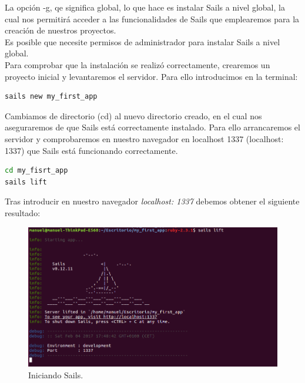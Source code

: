 \begin{appendices}
La opción -g, qe significa global, lo que hace es instalar Sails a nivel global, la cual nos permitirá acceder a las funcionalidades de Sails que emplearemos para la creación de nuestros proyectos.\\

Es posible que necesite permisos de administrador para instalar Sails a nivel global.\\

Para comprobar que la instalación se realizó correctamente, crearemos un proyecto inicial y levantaremos el servidor. Para ello introducimos en la terminal:\\

\begin{lstlisting}[language=bash]
sails new my_first_app
\end{lstlisting}

Cambiamos de directorio (cd) al nuevo directorio creado, en el cual nos aseguraremos de que Sails está correctamente instalado. Para ello arrancaremos el servidor y comprobaremos en nuestro navegador en localhost 1337 (localhost: 1337) que Sails está funcionando correctamente.\\


\begin{lstlisting}[language=bash]
cd my_fisrt_app
sails lift
\end{lstlisting}


Tras introducir en nuestro navegador \emph{localhost: 1337} debemos obtener el siguiente resultado:


\begin{figure}[H]
  \begin{center}
    \includegraphics[scale=0.3]{imagenes/running_sails.png}
  \end{center}
  \label{fig:logo}
 \caption{Iniciando Sails.}
\end{figure}



\end{appendices}
